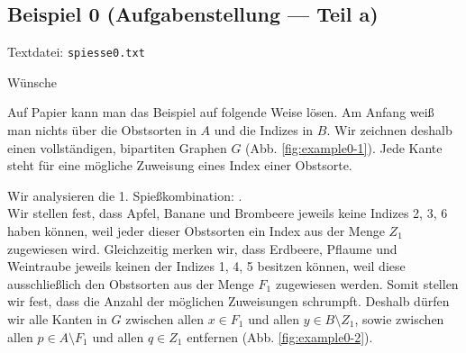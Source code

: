 \setcounter{subsection}{-1}
\subsection{Beispiel 0 (Aufgabenstellung --- Teil a)}\label{example:0}
Textdatei: \texttt{spiesse0.txt}
\vspace{0.25cm}

\noindent
Wünsche 
\vspace{0.25cm}

\noindent
{}
\vspace{0.5cm}

Auf Papier kann man das Beispiel auf folgende Weise lösen.
Am Anfang weiß man nichts über die Obstsorten in $A$ und die Indizes in $B$.
Wir zeichnen deshalb einen vollständigen, bipartiten Graphen $G$ (Abb. \ref{fig:example0-1}).
Jede Kante steht für eine mögliche Zuweisung eines Index einer Obstsorte.

Wir analysieren die 1. Spießkombination:
.\\
Wir stellen fest, dass Apfel, Banane und Brombeere jeweils keine Indizes 2, 3, 6 haben können,
weil jeder dieser Obstsorten ein Index aus der Menge $Z_1$ zugewiesen wird.
Gleichzeitig merken wir, dass Erdbeere, Pflaume und Weintraube jeweils keinen der Indizes
1, 4, 5 besitzen können, weil diese ausschließlich den Obstsorten aus der Menge $F_1$ zugewiesen werden.
Somit stellen wir fest, dass die Anzahl der möglichen Zuweisungen schrumpft.
Deshalb dürfen wir alle Kanten in $G$ zwischen allen $x \in F_1$ und allen $y \in B \setminus Z_1$,
sowie zwischen allen $p \in A \setminus F_1$ und allen $q \in Z_1$ entfernen (Abb. \ref{fig:example0-2}).

